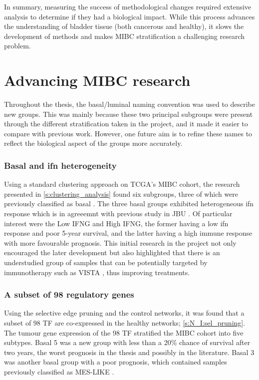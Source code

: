 In summary, measuring the success of methodological changes required extensive analysis to determine if they had a biological impact. While this process advances the understanding of bladder tissue (both cancerous and healthy), it slows the development of methods and makes MIBC stratification a challenging research problem.

\section{Advancing MIBC research}

Throughout the thesis, the basal/luminal naming convention was used to describe new groups. This was mainly because these two principal subgroups were present through the different stratification taken in the project, and it made it easier to compare with previous work. However, one future aim is to refine these names to reflect the biological aspect of the groups more accurately.

\subsubsection*{Basal and \acrlong{ifn} heterogeneity}

Using a standard clustering approach on TCGA's MIBC cohort, the research presented in \cref{s:clustering_analysis} found six subgroups, three of which were previously classified as basal \citep{Kamoun2020-tj, Robertson2017-mg, Marzouka2018-ge}. The three basal groups exhibited heterogeneous \acrshort{ifn} response which is in agreeemnt with previous study in JBU \citep{Baker2022-bj}. Of particular interest were the Low IFNG and High IFNG, the former having a low \acrshort{ifn} response and poor 5-year survival, and the latter having a high immune response with more favourable prognosis. This initial research in the project not only encouraged the later development but also highlighted that there is an understudied group of samples that can be potentially targeted by immunotherapy such as VISTA \citep{Baker2022-bj}, thus improving treatments.


\subsubsection*{A subset of 98 regulatory genes}

Using the selective edge pruning and the control networks, it was found that a subset of 98 TF are co-expressed in the healthy networks; \cref{s:N_I:sel_pruning}. The tumour gene expression of the 98 TF stratified the MIBC cohort into five subtypes. Basal 5 was a new group with less than a 20\% chance of survival after two years, the worst prognosis in the thesis and possibly in the literature. Basal 3 was another basal group with a poor prognosis, which contained samples previously classified as \gls{MES-LIKE} \citep{Marzouka2018-ge}.

